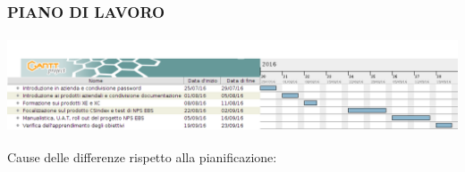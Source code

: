 \documentclass[hyperref={pdfpagemode=FullScreen},aspectratio=169]{beamer}
\begin{document}
\section{}
\begin{frame}
\frametitle{PIANO DI LAVORO}
\vspace{-20pt}
\begin{center}
     \includegraphics[height=80pt]{images/GanttPianificazione} 
     \end{center}  
\begin{block}{Cause delle differenze rispetto alla pianificazione:}
\begin{Large}
\begin{center}
\end{center}
\end{Large}
\end{block}
\vspace{-10pt}

\end{frame}
\end{document}
